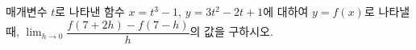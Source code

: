 매개변수 $t$로 나타낸 함수 $x=t^3-1$, $y=3t^2-2t+1$에 대하여 $y=f(x)$로 나타낼 때, $\displaystyle\lim_{h\to 0}\dfrac{f(7+2h)-f(7-h)}{h}$의 값을 구하시오.
